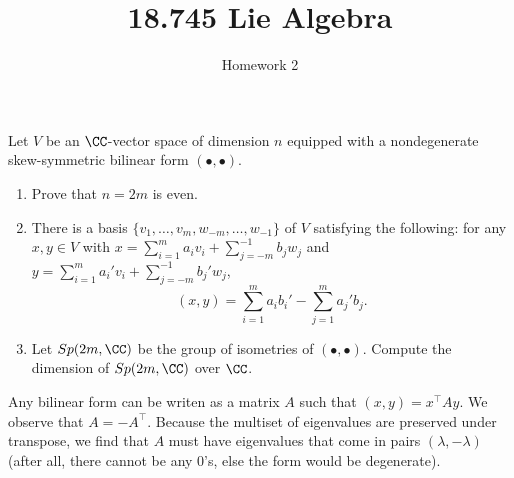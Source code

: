 \documentclass[11pt, headheight=30pt]{scrartcl}
\title{18.745 Lie Algebra}
\subtitle{Homework 2}
\begin{document}
\maketitle

\begin{prob*}
    Let $V$ be an $\CC$-vector space of dimension $n$
    equipped with a nondegenerate skew-symmetric
    bilinear form $(\bullet,\bullet)$. 
    \begin{enumerate}
        \item Prove that $n=2m$ is even.
        \item There is a basis $\{v_1,\ldots,v_m,w_{-m},\ldots,w_{-1}\}$ of $V$
            satisfying the following: for any $x,y\in V$ with
            $x=\sum_{i=1}^m a_iv_i + \sum_{j=-m}^{-1} b_jw_j$ and
            $y=\sum_{i=1}^m a_i'v_i + \sum_{j=-m}^{-1} b_j'w_j$,
            \[
                (x,y) = \sum_{i=1}^m a_ib_i' - \sum_{j=1}^m a_j'b_j.
            \]
        \item Let $Sp(2m,\CC)$ be the group of isometries of $(\bullet,\bullet)$.
            Compute the dimension of $Sp(2m,\CC)$ over $\CC$.
    \end{enumerate}
\end{prob*}
Any bilinear form can be writen as a matrix $A$ such that
$(x, y) = x^\top A y$. We observe that $A = -A^\top$. Because the multiset of
eigenvalues are preserved under transpose, we find that $A$ must have
eigenvalues that come in pairs $(\lambda, -\lambda)$ (after all, there cannot
be any $0$'s, else the form would be degenerate). 
\end{document}
